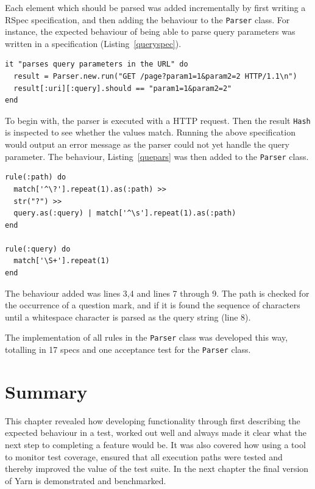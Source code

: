 Each element which should be parsed was added incrementally by first writing a
RSpec specification, and then adding the behaviour to the \texttt{Parser}
class. For instance, the expected behaviour of being able to parse query
parameters was written in a specification (Listing~\ref{queryspec}).

\bigskip
\begin{lstlisting}[label=queryspec,caption=Parser query parameter support specification (Yarn/spec/yarn/parser\_spec.rb:54).]
it "parses query parameters in the URL" do
  result = Parser.new.run("GET /page?param1=1&param2=2 HTTP/1.1\n")
  result[:uri][:query].should == "param1=1&param2=2"
end
\end{lstlisting}

To begin with, the parser is executed with a HTTP request. Then the result
\texttt{Hash} is inspected to see whether the values match. Running the above
specification would output an error message as the parser could not yet
handle the query parameter. The behaviour, Listing~\ref{quepars} was then
added to the \texttt{Parser} class.

\bigskip
\begin{lstlisting}[label=quepars,caption=URL query parameter support (Yarn/lib/yarn/parser.rb:31).]
rule(:path) do 
  match['^\?'].repeat(1).as(:path) >> 
  str("?") >> 
  query.as(:query) | match['^\s'].repeat(1).as(:path)
end

rule(:query) do
  match['\S+'].repeat(1)
end
\end{lstlisting}

The behaviour added was lines 3,4 and lines 7 through 9. The path is checked
for the occurrence of a question mark, and if it is found the sequence of
characters until a whitespace character is parsed as the query string (line 8).

The implementation of all rules in the \texttt{Parser} class was developed
this way, totalling in 17 specs and one acceptance test for the
\texttt{Parser} class.


\section{Summary}
This chapter revealed how developing functionality through first describing
the expected behaviour in a test, worked out well and always made it clear
what the next step to completing a feature would be. It was also covered how
using a tool to monitor test coverage, ensured that all execution paths were
tested and thereby improved the value of the test suite.
In the next chapter the final version of Yarn is demonstrated and benchmarked.
